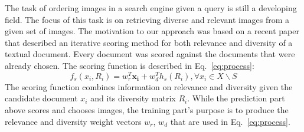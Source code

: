\documentclass{sig-alternate}
\begin{document}
{%
The task of ordering images in a search engine given a query is
still a developing field.  The focus of this
task is on retrieving diverse and relevant images from a given set of images.
The motivation to our approach was based on a recent paper \cite{fscore} that 
described an iterative scoring method for both relevance and diversity of 
a textual document. Every document was scored against the documents that were already 
chosen. The scoring function is described in Eq.~\ref{eq:process}:
\begin{equation}
f_{s}(x_{i},R_{i})=w_{r}^{T}\mathbf{x_{i}+}w_{d}^{T}h_{s}(R_{i}),\forall x_{i}\in X\backslash S\label{eq:process}
\end{equation}
The scoring function combines information on relevance and diversity given the candidate document $x_{i}$ and its
diversity matrix $R_{i}$. 
While the prediction part above scores and chooses images, the training part's purpose is
to produce the relevance and diversity weight vectors $w_{r}$, $w_{d}$ that are used in Eq.~\ref{eq:process}.



}
\end{document}
